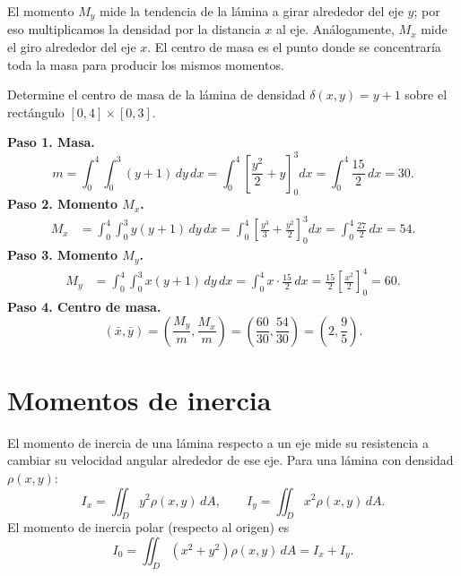 \begin{rem}
El momento \(M_y\) mide la tendencia de la lámina a girar alrededor del eje \(y\); por eso multiplicamos la densidad por la distancia \(x\) al eje. Análogamente, \(M_x\) mide el giro alrededor del eje \(x\). El centro de masa es el punto donde se concentraría toda la masa para producir los mismos momentos.
\end{rem}

\begin{prob}
Determine el centro de masa de la lámina de densidad $\delta(x,y)=y+1$ sobre el rectángulo $[0,4]\times[0,3]$.
\begin{myproof}
\textbf{Paso 1. Masa.}
\[
m=\int_{0}^{4}\int_{0}^{3}(y+1)\,dy\,dx = \int_{0}^{4}\left[\frac{y^2}{2}+y\right]_0^3 dx = \int_{0}^{4}\frac{15}{2}\,dx = 30.
\]
\textbf{Paso 2. Momento $M_x$.}
\begin{align*}
M_{x}&=\int_{0}^{4}\int_{0}^{3}y(y+1)\,dy\,dx
=\int_{0}^{4}\left[\frac{y^3}{3}+\frac{y^2}{2}\right]_0^3 dx
=\int_{0}^{4}\frac{27}{2}\,dx = 54.
\end{align*}
\textbf{Paso 3. Momento $M_y$.}
\begin{align*}
M_{y}&=\int_{0}^{4}\int_{0}^{3}x(y+1)\,dy\,dx
=\int_{0}^{4}x\cdot\frac{15}{2}\,dx
=\frac{15}{2}\left[\frac{x^2}{2}\right]_0^4 = 60.
\end{align*}
\textbf{Paso 4. Centro de masa.}
\[
(\bar{x},\bar{y}) = \left(\frac{M_y}{m},\frac{M_x}{m}\right) = \left(\frac{60}{30},\frac{54}{30}\right) = \boxed{\left(2,\frac{9}{5}\right)}.
\]
\end{myproof}
\end{prob}

\section{Momentos de inercia}

El momento de inercia de una lámina respecto a un eje mide su resistencia a cambiar su velocidad angular alrededor de ese eje. Para una lámina con densidad \(\rho(x,y)\):
\[
I_x = \iint_D y^2 \rho(x,y)\,dA,\qquad
I_y = \iint_D x^2 \rho(x,y)\,dA.
\]
El momento de inercia polar (respecto al origen) es
\[
I_0 = \iint_D (x^2+y^2)\rho(x,y)\,dA = I_x + I_y.
\]

